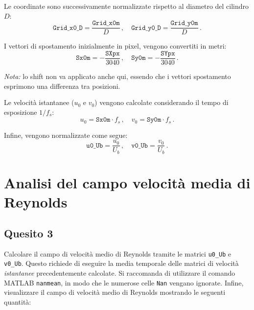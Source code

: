 Le coordinate sono successivamente normalizzate rispetto al diametro del cilindro \(D\):
\[
\texttt{Grid\_x0\_D} = \frac{\texttt{Grid\_x0m}}{D}\,, \quad \texttt{Grid\_y0\_D} = \frac{\texttt{Grid\_y0m}}{D}\,.
\]

I vettori di spostamento inizialmente in pixel, vengono convertiti in metri:
\[
\texttt{Sx0m} = -\frac{\texttt{SXpx}}{3040}\,, \quad \texttt{Sy0m} = -\frac{\texttt{SYpx}}{3040}\,.
\]

\emph{Nota:} lo shift non va applicato anche qui, essendo che i vettori spostamento esprimono una differenza tra posizioni.

Le velocità istantanee (\(u_0\) e \(v_0\)) vengono calcolate considerando il tempo di esposizione \(1/f_s\):
\[
u_0 = \texttt{Sx0m} \cdot f_s\,, \quad v_0 = \texttt{Sy0m} \cdot f_s\,.
\]

Infine, vengono normalizzate come segue:
\begin{equation*}
\texttt{u0\_Ub} = \frac{u_0}{U_b}\,,\quad  \texttt{v0\_Ub} = \frac{v_0}{U_b}\,.
\end{equation*}




\section*{Analisi del campo velocità media di Reynolds}

\subsection*{Quesito 3}

Calcolare il campo di velocità medio di Reynolds tramite le matrici \texttt{u0\_Ub} e \texttt{v0\_Ub}. Questo richiede di eseguire la media temporale delle matrici di velocità \emph{istantanee} precedentemente calcolate. Si raccomanda di utilizzare il comando MATLAB \texttt{nanmean}, in modo che le numerose celle \texttt{Nan} vengano ignorate. Infine, visualizzare il campo di velocità medio di Reynolds mostrando le seguenti quantità:


